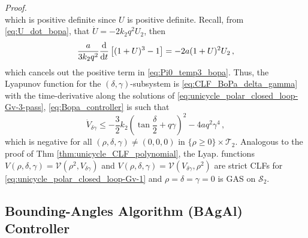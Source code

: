 \documentclass[journal,twoside,web]{ieeecolor}
\theoremstyle{definition}
\renewenvironment{proof}[1][Proof]{\par\pushQED{\qed}\normalfont\textit{#1.}~}{\popQED\par}
\begin{document}
\begin{proof}
\begin{equation}
\end{equation}
which is positive definite since $U$ is positive definite. Recall, from \eqref{eq:U_dot_bopa}, that $\dot U = -2k_2 q^2 U_2$, then
\begin{align}
\frac{a}{3k_2 q^2}\frac{{\rm d} }{{\rm d} t} \left[ (1+U)^3 - 1\right] = - 2a(1+U)^2 U_2 \,,
\end{align}
which cancels out the positive term in \eqref{eq:Pi0_temp3_bopa}.
Thus, the Lyapunov function for the $(\delta,\gamma)$-subsystem is  \eqref{eq:CLF_BoPa_delta_gamma}
with the time-derivative along the solutions of \eqref{eq:unicycle_polar_closed_loop-Gv-3-pass}, \eqref{eq:Bopa_controller} is such that
\begin{equation}
\dot V_{\delta \gamma} \le  - \frac{3}{2} k_2 \left(\tan \frac{\delta}{2} + q \gamma \right)^2 - 4 a q^2 \gamma^4 \,,
\label{eq:V_dot_bopa}
\end{equation}
which is negative for all $(\rho,\delta, \gamma) \ne (0,0,0)$ in $\{\rho \ge 0\} \times \mathcal{T}_2$. Analogous to the proof of Thm \ref{thm:unicycle_CLF_polynomial},  the Lyap. functions $V(\rho, \delta, \gamma) = \mathcal{V}(\rho^2, V_{\delta \gamma})$ and $V(\rho, \delta, \gamma) = \mathcal{V}(V_{\delta \gamma},\rho^2)$  are strict CLFs for \eqref{eq:unicycle_polar_closed_loop-Gv-1} and %
$\rho =  \delta = \gamma = 0$ is GAS on $\mathcal{S}_2$.
\end{proof}



\subsection{Bounding-Angles Algorithm (BAgAl) Controller}
\end{document}
